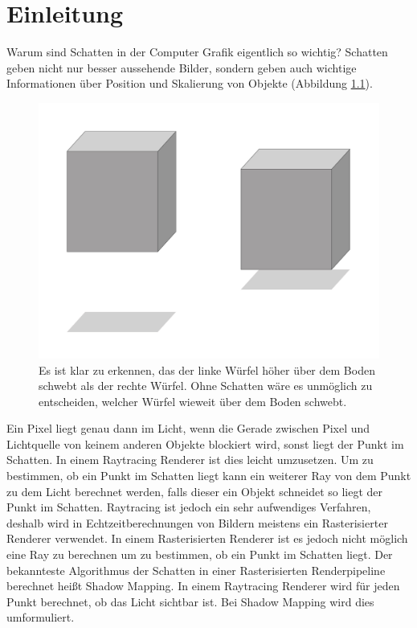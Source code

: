 

\chapter{Einleitung}
\label{ch:Introduction}
Warum sind Schatten in der Computer Grafik eigentlich so wichtig?
Schatten geben nicht nur besser aussehende Bilder, sondern geben auch wichtige Informationen über Position und Skalierung von Objekte
(Abbildung \ref{fig:why-shadows}).

\begin{figure}[H]
	\begin{center}
		\includegraphics[width=.3\textwidth]{res/img/why-shadows.jpg}
    \caption{Es ist klar zu erkennen, das der linke Würfel höher über dem Boden schwebt als der rechte Würfel. 
    Ohne Schatten wäre es unmöglich zu entscheiden, welcher Würfel wieweit über dem Boden schwebt.}
	\end{center}
	\label{fig:why-shadows}
\end{figure}
Ein Pixel liegt genau dann im Licht, wenn die Gerade zwischen Pixel 
und Lichtquelle von keinem anderen Objekte blockiert wird, sonst liegt der Punkt im Schatten. 
In einem Raytracing Renderer ist dies leicht umzusetzen. 
Um zu bestimmen, ob ein Punkt im Schatten liegt kann ein weiterer Ray von dem Punkt zu dem Licht berechnet werden, 
falls dieser ein Objekt schneidet so liegt der Punkt im Schatten.
Raytracing ist jedoch ein sehr aufwendiges Verfahren, deshalb wird in Echtzeitberechnungen von Bildern meistens
ein Rasterisierter Renderer verwendet.
In einem Rasterisierten Renderer ist es jedoch nicht möglich eine Ray zu berechnen um zu bestimmen, ob
ein Punkt im Schatten liegt.
\newline 
\newline
Der bekannteste Algorithmus der Schatten in einer Rasterisierten Renderpipeline 
berechnet heißt Shadow Mapping.
In einem Raytracing Renderer wird für jeden Punkt berechnet, ob das Licht sichtbar ist.
Bei Shadow Mapping wird dies umformuliert. 
